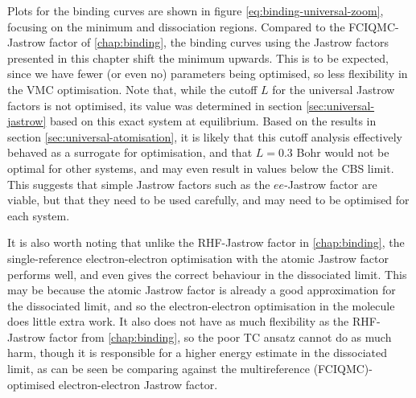 Plots for the binding curves are shown in figure \ref{eq:binding-universal-zoom}, focusing on the minimum and dissociation regions. Compared to the FCIQMC-Jastrow factor of \autoref{chap:binding}, the binding curves using the Jastrow factors presented in this chapter shift the minimum upwards. This is to be expected, since we have fewer (or even no) parameters being optimised, so less flexibility in the VMC optimisation. Note that, while the cutoff $L$ for the universal Jastrow factors is not optimised, its value was determined in section \ref{sec:universal-jastrow} based on this exact system at equilibrium. Based on the results in section \ref{sec:universal-atomisation}, it is likely that this cutoff analysis effectively behaved as a surrogate for optimisation, and that $L=0.3$ Bohr would not be optimal for other systems, and may even result in values below the CBS limit. This suggests that simple Jastrow factors such as the $ee$-Jastrow factor are viable, but that they need to be used carefully, and may need to be optimised for each system.

It is also worth noting that unlike the RHF-Jastrow factor in \autoref{chap:binding}, the single-reference electron-electron optimisation with the atomic Jastrow factor performs well, and even gives the correct behaviour in the dissociated limit. This may be because the atomic Jastrow factor is already a good approximation for the dissociated limit, and so the electron-electron optimisation in the molecule does little extra work. It also does not have as much flexibility as the RHF-Jastrow factor from \autoref{chap:binding}, so the poor TC ansatz cannot do as much harm, though it is responsible for a higher energy estimate in the dissociated limit, as can be seen be comparing against the multireference (FCIQMC)-optimised electron-electron Jastrow factor.

